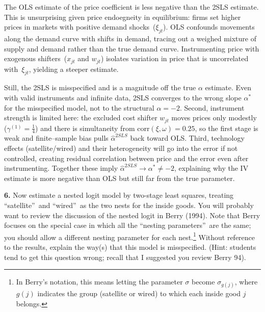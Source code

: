 \documentclass{article}
\begin{document}
The OLS estimate of the price coefficient is less negative than the 2SLS estimate. This is unsurprising given price endoegneity in equilibrium: firms set higher prices in markets with positive demand shocks~($\xi_{jt}$). OLS confounds movements along the demand curve with shifts in demand, tracing out a weighed mixture of supply and demand rather than the true demand curve. Instrumenting price with exogenous shifters~($x_{jt}$ and $w_{jt}$) isolates variation in price that is uncorrelated with~$\xi_{jt}$, yielding a steeper estimate.

\vspace{5mm}

Still, the 2SLS is misspecified and is a magnitude off the true $\alpha$ estimate. Even with valid instruments and infinite data, 2SLS converges to the wrong slope $\alpha^\ast$ for the misspecified model, not to the structural $\alpha=-2$. Second, instrument strength is limited here: the excluded cost shifter $w_{jt}$ moves prices only modestly ($\gamma^{(1)}=\tfrac{1}{4}$) and there is simultaneity from $\mathrm{corr}(\xi,\omega)=0.25$, so the first stage is weak and finite–sample bias pulls $\hat\alpha^{2SLS}$ back toward OLS. Third, technology effects (satellite/wired) and their heterogeneity will go into the error if not controlled, creating residual correlation between price and the error even after instrumenting. Together these imply $\hat\alpha^{2SLS}\to \alpha^\ast\neq -2$, explaining why the IV estimate is more negative than OLS but still far from the true parameter.








\begin{tcolorbox}
\textbf{6.} Now estimate a nested logit model by two-stage least squares,
treating \textquotedblleft satellite\textquotedblright\ and
\textquotedblleft wired\textquotedblright\ as the two nests for the inside
goods. You will probably want to review the discussion of the nested logit
in Berry (1994). Note that Berry focuses on the special case in which all
the \textquotedblleft nesting parameters\textquotedblright\ are the same;
you should allow a different nesting parameter for each nest.\footnote{%
In Berry's notation, this means letting the parameter $\sigma $ become $%
\sigma _{g(j)}$, where $g\left( j\right) $ indicates the group (satellite or
wired) to which each inside good $j$ belongs.} Without reference to the
results, explain the way(s) that this model is misspecified. (Hint: students
tend to get this question wrong; recall that I suggested you review Berry
94).
\end{tcolorbox}
\end{document}
